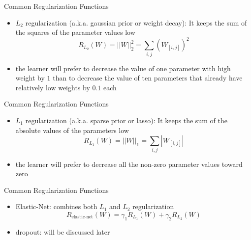 \begin{frame}{Common Regularization Functions}
    \begin{itemize}
        \item<1-> $L_2$ regularization (a.k.a. gaussian prior or weight decay): It keeps the sum of the squares of the parameter values low
        \begin{equation*}
            R_{L_2}(W) = ||W||_2^2 = \sum_{i,j}{(W_{[i,j]})^2}
        \end{equation*}
        \item<2-> the learner will prefer to decrease the value of one parameter with high weight by $1$ than to decrease the value of ten parameters that already have relatively low weights by $0.1$ each
    \end{itemize}
\end{frame}
\begin{frame}{Common Regularization Functions}
    \begin{itemize}
        \item<1-> $L_1$ regularization (a.k.a. sparse prior or lasso): It keeps  the sum of the absolute values of the parameters low
        \begin{equation*}
            R_{L_1}(W) = ||W||_1 = \sum_{i,j}{|W_{[i,j]}|}
        \end{equation*}
        \item<2-> the learner will prefer to decrease all the non-zero parameter values toward zero
    \end{itemize}
\end{frame}
\begin{frame}{Common Regularization Functions}
    \begin{itemize}
        \item<1-> Elastic-Net: combines both $L_1$ and $L_2$ regularization
        \begin{equation*}
            R_{\text{elastic-net}}(W) = \gamma_1 R_{L_1}(W) + \gamma_2 R_{L_2}(W)
        \end{equation*}
        \item<2-> dropout: will be discussed later
    \end{itemize}
\end{frame}